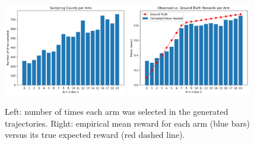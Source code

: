 \begin{figure}[htbp]
    \centering
    \includegraphics[width=0.48\textwidth]{./Img/stochastic_bandit/count.png}
    \includegraphics[width=0.48\textwidth]{./Img/stochastic_bandit/reward.png}
    \caption{Left: number of times each arm was selected in the generated trajectories. Right: empirical mean reward for each arm (blue bars) versus its true expected reward (red dashed line).}
    \label{fig:distribution}
\end{figure}
